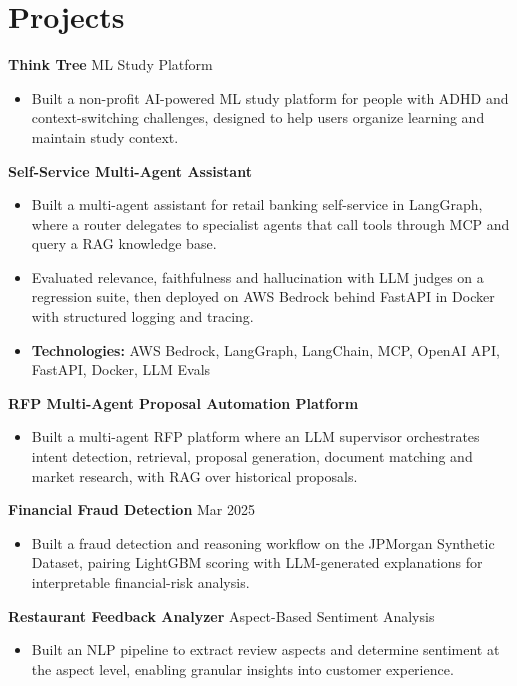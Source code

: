 \documentclass[10pt,a4paper]{article}
\begin{document}
\section{Projects}
\textbf{Think Tree} \textbar{} ML Study Platform\par
\begin{itemize}
  \item Built a non-profit AI-powered ML study platform for people with ADHD and context-switching challenges, designed to help users organize learning and maintain study context.
\end{itemize}
\textbf{Self-Service Multi-Agent Assistant}\par
\begin{itemize}
  \item Built a multi-agent assistant for retail banking self-service in LangGraph, where a router delegates to specialist agents that call tools through MCP and query a RAG knowledge base.
  \item Evaluated relevance, faithfulness and hallucination with LLM judges on a regression suite, then deployed on AWS Bedrock behind FastAPI in Docker with structured logging and tracing.
  \item \textbf{Technologies:} AWS Bedrock, LangGraph, LangChain, MCP, OpenAI API, FastAPI, Docker, LLM Evals
\end{itemize}
\textbf{RFP Multi-Agent Proposal Automation Platform}\par
\begin{itemize}
  \item Built a multi-agent RFP platform where an LLM supervisor orchestrates intent detection, retrieval, proposal generation, document matching and market research, with RAG over historical proposals.
\end{itemize}
\textbf{Financial Fraud Detection} \textbar{} Mar 2025\par
\begin{itemize}
  \item Built a fraud detection and reasoning workflow on the JPMorgan Synthetic Dataset, pairing LightGBM scoring with LLM-generated explanations for interpretable financial-risk analysis.
\end{itemize}
\textbf{Restaurant Feedback Analyzer} \textbar{} Aspect-Based Sentiment Analysis\par
\begin{itemize}
  \item Built an NLP pipeline to extract review aspects and determine sentiment at the aspect level, enabling granular insights into customer experience.
\end{itemize}
\end{document}
